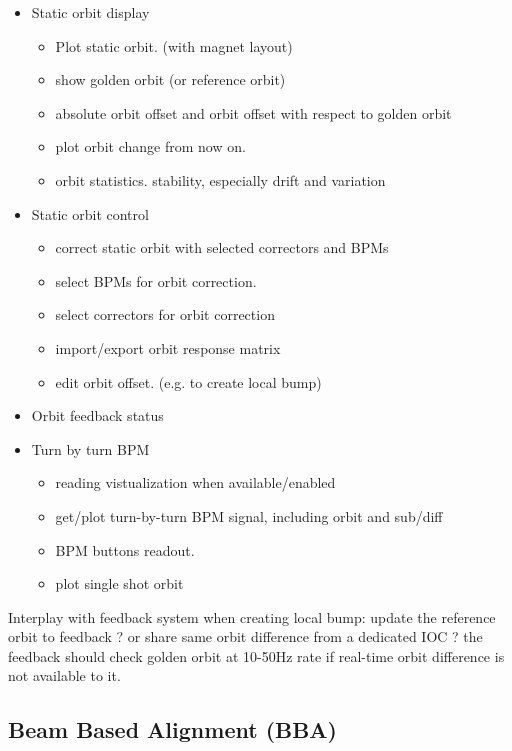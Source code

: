 \documentclass[letterpaper,showtrims]{memoir}
\begin{document}
\begin{itemize}
\item Static orbit display
      \begin{itemize}%
      \item Plot static orbit. (with magnet layout)
      \item show golden orbit (or reference orbit)
      \item absolute orbit offset and orbit offset with respect to golden orbit
      \item plot orbit change from now on.
      \item orbit statistics. stability, especially drift and variation
      \end{itemize}
\item Static orbit control
      \begin{itemize}%
      \item correct static orbit with selected correctors and BPMs
      \item select BPMs for orbit correction.
      \item select correctors for orbit correction
      \item import/export orbit response matrix
      \item edit orbit offset. (e.g. to create local bump)
      \end{itemize}
\item Orbit feedback status
\item Turn by turn BPM
      \begin{itemize}%
      \item reading vistualization when available/enabled
      \item get/plot turn-by-turn BPM signal, including orbit and sub/diff
      \item BPM buttons readout.
      \item plot single shot orbit
      \end{itemize}
\end{itemize}

Interplay with feedback system when creating local bump: update the
reference orbit to feedback ? or share same orbit difference from a
dedicated IOC ? the feedback should check golden orbit at 10-50Hz rate
if real-time orbit difference is not available to it.


\subsection{Beam Based Alignment (BBA)}
\end{document}
